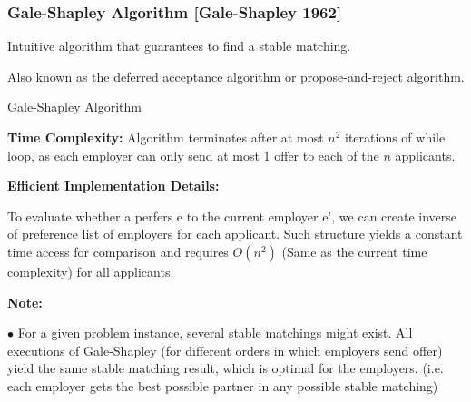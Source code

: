 \documentclass[10pt]{article}
\begin{document}
\newpage

\subsubsection*{Gale-Shapley Algorithm [Gale-Shapley 1962]}

Intuitive algorithm that guarantees to find a stable matching.

Also known as the deferred acceptance algorithm or propose-and-reject algorithm.

\begin{algorithm}
	\SetAlgoLined
	
	\caption{Gale-Shapley Algorithm}
\end{algorithm}

\textbf{Time Complexity:} Algorithm terminates after at most $n^2$ iterations of while loop, as each employer can only send at most 1 offer to each of the $n$ applicants.

\textbf{Efficient Implementation Details:}

To evaluate whether a perfers e to the current employer e', we can create inverse of preference list of employers for each applicant. Such structure yields a constant time access for comparison and requires $O(n^2)$ (Same as the current time complexity) for all applicants.

\textbf{Note:}

$\bullet$ For a given problem instance, several stable matchings might exist. All executions of Gale-Shapley (for different orders in which employers send offer) yield the same stable matching result, which is optimal for the employers. (i.e. each employer gets the best possible partner in any possible stable matching)
\end{document}
